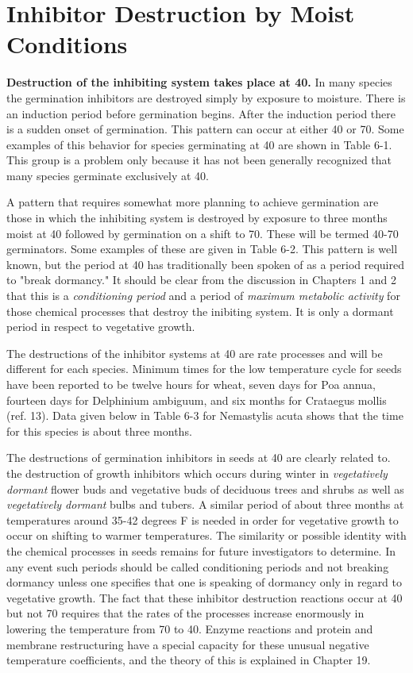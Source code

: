\chapter{Inhibitor Destruction by Moist Conditions}

\textbf{Destruction of the inhibiting system takes place at 40.} In many
species the germination inhibitors are destroyed simply by exposure to moisture.
There is an induction period before germination begins. After the induction period
there is a sudden onset of germination. This pattern can occur at either 40 or 70.
Some examples of this behavior for species germinating at 40 are shown in Table 6-1.
This group is a problem only because it has not been generally recognized that many
species germinate exclusively at 40.

A pattern that requires somewhat more planning to achieve germination are
those in which the inhibiting system is destroyed by exposure to three months moist at
40 followed by germination on a shift to 70. These will be termed 40-70 germinators.
Some examples of these are given in Table 6-2. This pattern is well known, but the
period at 40 has traditionally been spoken of as a period required to "break
dormancy." It should be clear from the discussion in Chapters 1 and 2 that this is a
\textit{conditioning period} and a period of \textit{maximum metabolic activity} for those chemical
processes that destroy the inibiting system. It is only a dormant period in respect to
vegetative growth.

The destructions of the inhibitor systems at 40 are rate processes and will be
different for each species. Minimum times for the low temperature cycle for seeds
have been reported to be twelve hours for wheat, seven days for Poa annua, fourteen
days for Delphinium ambiguum, and six months for Crataegus mollis (ref. 13). Data
given below in Table 6-3 for Nemastylis acuta shows that the time for this species is
about three months.

The destructions of germination inhibitors in seeds at 40 are clearly related to.
the destruction of growth inhibitors which occurs during winter in \textit{vegetatively dormant}
flower buds and vegetative buds of deciduous trees and shrubs as well as \textit{vegetatively
dormant} bulbs and tubers. A similar period of about three months at temperatures
around 35-42 degrees F is needed in order for vegetative growth to occur on shifting to
warmer temperatures. The similarity or possible identity with the chemical processes
in seeds remains for future investigators to determine. In any event such periods
should be called conditioning periods and not breaking dormancy unless one
specifies that one is speaking of dormancy only in regard to vegetative growth.
The fact that these inhibitor destruction reactions occur at 40 but not 70 requires
that the rates of the processes increase enormously in lowering the temperature from
70 to 40. Enzyme reactions and protein and membrane restructuring have a special
capacity for these unusual negative temperature coefficients, and the theory of this is
explained in Chapter 19.

